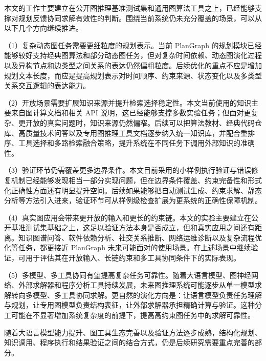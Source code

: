 本文的工作主要建立在公开图推理基准测试集和通用图算法工具之上，已经能够支撑对规划反馈协同求解有效性的判断。围绕当前系统仍未充分覆盖的场景，可以从以下几个方向继续推进。

（1）复杂动态图任务需要更细粒度的规划表示。当前 PlanGraph 的规划模块已经能够较好支持经典图算法和部分动态图任务，但对复杂时间依赖、动态图演化过程以及异构节点和边类型之间关系的表达仍然偏粗粒度。后续优化的重点不应是增加规划文本长度，而应是提高规划表示对时间顺序、约束来源、状态变化以及多类型关系交互逻辑的表达能力。

（2）开放场景需要扩展知识来源并提升检索选择稳定性。本文当前使用的知识主要来自图计算文档和相关 API 说明，这已经能够支撑多数实验任务；但面对更复杂、更开放的真实问题时，知识来源仍然偏窄。后续可以把算法教材、经典代码仓库、高质量技术问答以及专用图推理工具文档逐步纳入统一知识库，并配合重排序、工具选择和多路检索融合策略，提升系统在不同任务下调用外部知识的准确性。

（3）验证环节仍需覆盖更多边界条件。本文目前采用的小样例执行验证与错误修复机制已经能够发现相当一部分实现问题，但在边界条件覆盖、约束完备性和形式化正确性方面还有明显提升空间。后续如果能够把自动测试生成、约束求解、静态分析等方法引入进来，验证环节可从样例级检查扩展为更系统的正确性保障机制。

（4）真实图应用会带来更开放的输入和更长的约束链。本文的实验主要建立在公开基准测试集基础之上，这足以验证方法本身是否成立，但和真实应用之间还有距离。知识图谱问答、软件依赖分析、社交关系推断、网络运维诊断以及复杂流程优化等任务，都更接近 PlanGraph 未来可能面对的使用场景。在上述场景中继续验证，可用于评估其在开放输入、长链约束和多工具协同条件下的实际表现。

（5）多模型、多工具协同有望提高复杂任务可靠性。随着大语言模型、图神经网络、外部求解器和程序分析工具持续发展，未来图推理系统可能逐步从单一模型求解转向多模型、多工具协同求解。更自然的演化方向是：让语言模型负责任务理解与规划，让专用图模型负责结构表征，让外部求解器承担精确计算与验证。这种分工可能在不显著增加系统复杂度的前提下，提高高约束图任务中的求解可靠性。

随着大语言模型能力提升、图工具生态完善以及验证方法逐步成熟，结构化规划、知识调用、程序执行和结果验证之间的结合方式，仍是后续研究需要重点完善的部分。
